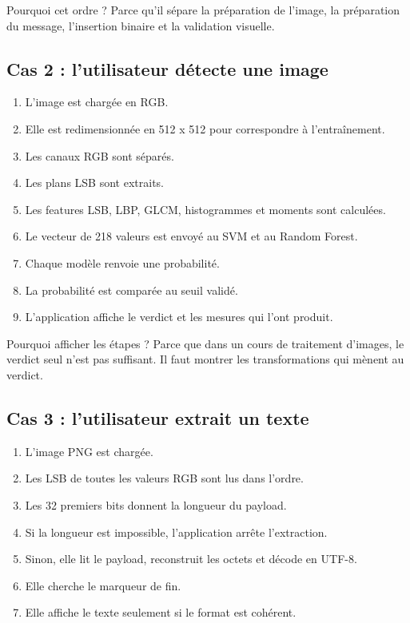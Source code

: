 \documentclass[11pt,a4paper]{article}
\begin{document}
Pourquoi cet ordre ? Parce qu'il sépare la préparation de l'image, la préparation du message, l'insertion binaire et la validation visuelle.

\subsection*{Cas 2 : l'utilisateur détecte une image}
\begin{enumerate}
  \item L'image est chargée en RGB.
  \item Elle est redimensionnée en 512 x 512 pour correspondre à l'entraînement.
  \item Les canaux RGB sont séparés.
  \item Les plans LSB sont extraits.
  \item Les features LSB, LBP, GLCM, histogrammes et moments sont calculées.
  \item Le vecteur de 218 valeurs est envoyé au SVM et au Random Forest.
  \item Chaque modèle renvoie une probabilité.
  \item La probabilité est comparée au seuil validé.
  \item L'application affiche le verdict et les mesures qui l'ont produit.
\end{enumerate}

Pourquoi afficher les étapes ? Parce que dans un cours de traitement d'images, le verdict seul n'est pas suffisant. Il faut montrer les transformations qui mènent au verdict.

\subsection*{Cas 3 : l'utilisateur extrait un texte}
\begin{enumerate}
  \item L'image PNG est chargée.
  \item Les LSB de toutes les valeurs RGB sont lus dans l'ordre.
  \item Les 32 premiers bits donnent la longueur du payload.
  \item Si la longueur est impossible, l'application arrête l'extraction.
  \item Sinon, elle lit le payload, reconstruit les octets et décode en UTF-8.
  \item Elle cherche le marqueur de fin.
  \item Elle affiche le texte seulement si le format est cohérent.
\end{enumerate}
\end{document}
